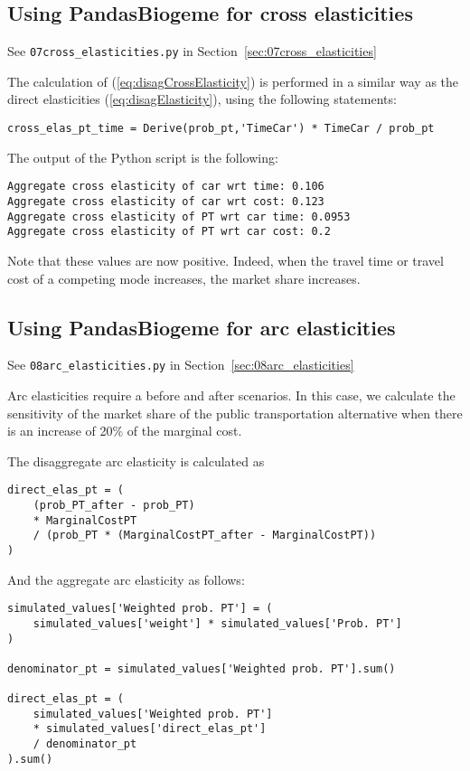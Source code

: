 \documentclass[12pt,a4paper]{article}
\newcommand{\req}[1]{(\ref{#1})}
\begin{document}
\subsection{Using PandasBiogeme for cross elasticities}

\begin{flushright}
See \lstinline$07cross_elasticities.py$ in Section~\ref{sec:07cross_elasticities}
\end{flushright}



The calculation of \req{eq:disagCrossElasticity} is performed in a
similar way as the direct elasticities \req{eq:disagElasticity}, using the following statements:
\begin{lstlisting}
cross_elas_pt_time = Derive(prob_pt,'TimeCar') * TimeCar / prob_pt
\end{lstlisting}

The output of the Python script is the following:
\begin{lstlisting}
Aggregate cross elasticity of car wrt time: 0.106
Aggregate cross elasticity of car wrt cost: 0.123
Aggregate cross elasticity of PT wrt car time: 0.0953
Aggregate cross elasticity of PT wrt car cost: 0.2
\end{lstlisting}
Note that these values are now positive. Indeed, when the travel time
or travel cost of a competing mode increases, the market share
increases.


\subsection{Using PandasBiogeme for arc elasticities}

\begin{flushright}
See \lstinline$08arc_elasticities.py$ in Section~\ref{sec:08arc_elasticities}
\end{flushright}


Arc elasticities require a before and after scenarios. In this case,
we calculate the sensitivity of the market share of the public transportation
alternative when there is an increase of 20\% of the marginal cost.

The disaggregate arc elasticity is calculated as
\begin{lstlisting}[style=nonumbers]
direct_elas_pt = (
    (prob_PT_after - prob_PT)
    * MarginalCostPT
    / (prob_PT * (MarginalCostPT_after - MarginalCostPT))
)
\end{lstlisting}

And the aggregate arc elasticity as follows:
\begin{lstlisting}[style=nonumbers]
simulated_values['Weighted prob. PT'] = (
    simulated_values['weight'] * simulated_values['Prob. PT']
)

denominator_pt = simulated_values['Weighted prob. PT'].sum()

direct_elas_pt = (
    simulated_values['Weighted prob. PT']
    * simulated_values['direct_elas_pt']
    / denominator_pt
).sum()
\end{lstlisting}
\end{document}
